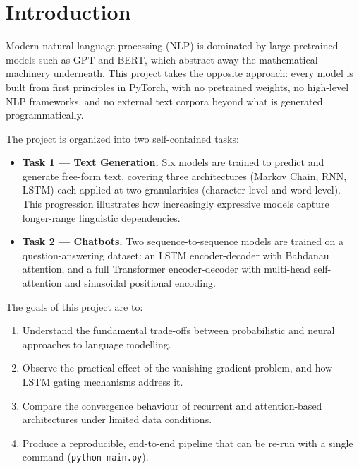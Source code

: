 \section{Introduction}
\label{sec:introduction}

Modern natural language processing (NLP) is dominated by large pretrained models
such as GPT and BERT, which abstract away the mathematical machinery underneath.
This project takes the opposite approach: every model is built from first principles
in PyTorch, with no pretrained weights, no high-level NLP frameworks, and no
external text corpora beyond what is generated programmatically.

The project is organized into two self-contained tasks:

\begin{itemize}
    \item \textbf{Task 1 — Text Generation.} Six models are trained to predict and
          generate free-form text, covering three architectures (Markov Chain, RNN,
          LSTM) each applied at two granularities (character-level and word-level).
          This progression illustrates how increasingly expressive models capture
          longer-range linguistic dependencies.

    \item \textbf{Task 2 — Chatbots.} Two sequence-to-sequence models are trained
          on a question-answering dataset: an LSTM encoder-decoder with Bahdanau
          attention, and a full Transformer encoder-decoder with multi-head
          self-attention and sinusoidal positional encoding.
\end{itemize}

The goals of this project are to:
\begin{enumerate}
    \item Understand the fundamental trade-offs between probabilistic and
          neural approaches to language modelling.
    \item Observe the practical effect of the vanishing gradient problem, and
          how LSTM gating mechanisms address it.
    \item Compare the convergence behaviour of recurrent and attention-based
          architectures under limited data conditions.
    \item Produce a reproducible, end-to-end pipeline that can be re-run with
          a single command (\texttt{python main.py}).
\end{enumerate}
